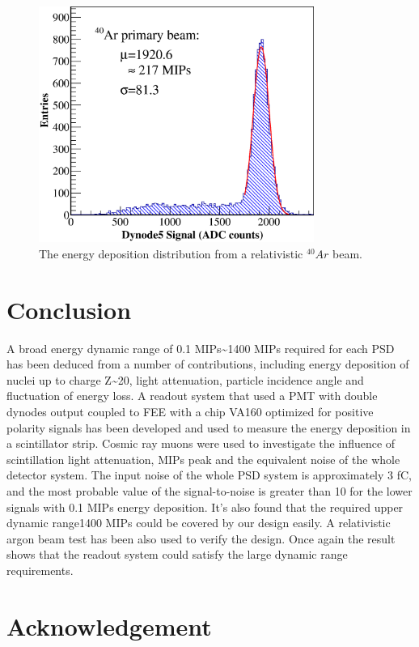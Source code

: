 \documentclass[5p, times]{elsarticle}
\begin{document}
\begin{figure}
 \centering
 \includegraphics[width=90mm]{Ar}
\caption{The energy deposition distribution from a relativistic $^{40}Ar$ beam.}
\label{fig:Ar}
\end{figure} 

\section{Conclusion}
\label{sec:conclustion}

A broad energy dynamic range of 0.1 MIPs\~{}1400 MIPs required for each PSD has been deduced from a number of
contributions, including energy deposition of nuclei up to charge Z\~{}20, light attenuation, particle incidence angle
and fluctuation of energy loss. A readout system that used a PMT with double dynodes output coupled to FEE with a chip
VA160 optimized for positive polarity signals has been developed and used to measure the energy deposition in a
scintillator strip. Cosmic ray muons were used to investigate the influence of scintillation light attenuation, MIPs
peak and the equivalent noise of the whole detector system. The input noise of the whole PSD system is approximately 3
fC, and the most probable value of the signal-to-noise is greater than 10 for the lower signals with 0.1 MIPs energy
deposition. It’s also found that the required upper dynamic range1400 MIPs could be covered by our design easily. A
relativistic argon beam test has been also used to verify the design. Once again the result shows that the readout
system could satisfy the large dynamic range requirements.

\section*{Acknowledgement}
\label{sec:acknowledgement}
\end{document}
